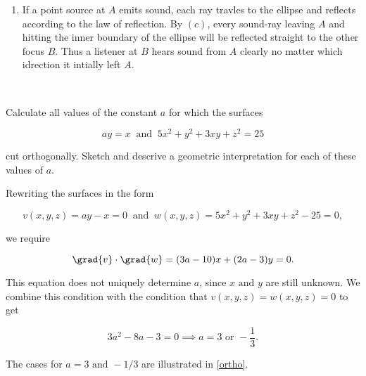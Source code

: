 \documentclass[english,a4paper,12pt]{report}
\begin{document}
{\begin{enumerate}
	with their gradients

	\begin{equation}
		\grad{AP} = \frac{(x+c)\vu{i} +y \vu{j} }{AP} ~\text { and }~ \grad{BP} = \frac{(x-c)\vu{i} +y \vu{j} }{BP}.    
	\end{equation}

	The equal angles can be shown by 

	\begin{equation}
		\grad{AP} \cdot \grad{\phi } = \grad{BP} \cdot \grad{\phi }.    
	\end{equation}
	
	Substituting and expanding we get 

	\begin{equation}
		a^2y^2 + a^2x^2 + a^2c^2- a^{4} - x^2c^2 = 0, 
	\end{equation}
	
	which is indeed true once we substitute \(c^2 = a^2-b^2\) and the ellipse equation \(x^2 /a^2 + y^2 /b^2 = 1\).  
	
	\item If a point source at \(A\) emits sound, each ray travles to the ellipse and reflects according to the law of reflection. By \((c)\), every sound-ray leaving \(A\) and hitting the inner boundary of the ellipse will be reflected straight to the other focus \(B\). Thus a listener at \(B\) hears sound from \(A\) clearly no matter which idrection it intially left \(A\).
	
\end{enumerate}
~
} 

{Calculate all values of the constant \(a\) for which the surfaces 

\begin{equation}
	ay = x ~\text { and }~ 5x^2+y^2+3xy+z^2 = 25
\end{equation}

cut orthogonally. Sketch and descrive a geometric interpretation for each of these values of \(a\).
}
{Rewriting the surfaces in the form 

\begin{equation}
	v(x,y,z) = ay-x = 0 ~\text { and }~ w(x,y,z) = 5x^2+y^2+3xy+z^2-25 = 0,
\end{equation}

we require 

\begin{equation}
	\grad{v} \cdot \grad{w} = (3a-10)x + (2a-3)y = 0.  
\end{equation}

This equation does not uniquely determine \(a\), since \(x \text { and } y\) are still unknown. We combine this condition with the condition that \(v(x,y,z) = w(x,y,z) = 0\) to get 

\begin{equation}
	3a^2-8a-3 = 0 \implies a = 3 \text { or } -\frac{1}{3}. 
\end{equation}

The cases for \(a = 3 \text { and } -1/3\) are illustrated in \cref{ortho}. 
} 
\end{document}

